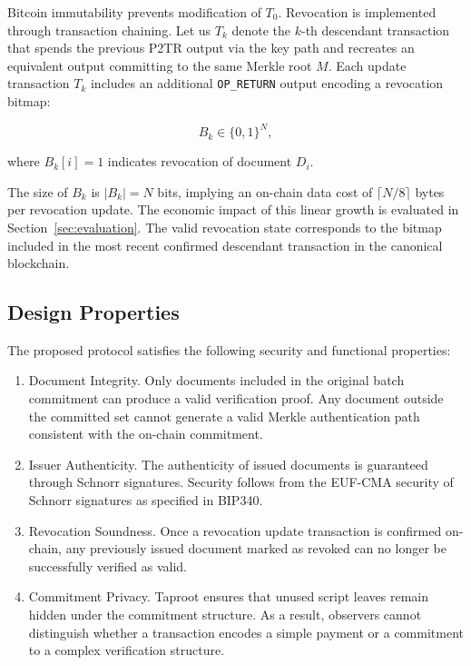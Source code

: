 \documentclass{IEEEoj}
\begin{document}
Bitcoin immutability prevents modification of $T_0$.  Revocation is implemented through transaction chaining. Let us $T_k$ denote the $k$-th descendant transaction that spends the previous P2TR output via the key path and recreates an equivalent output committing to the same Merkle root $M$. Each update transaction $T_k$ includes an additional \texttt{OP\_RETURN} output encoding a revocation bitmap:

\begin{equation}
B_k \in \{0,1\}^N,
\end{equation}

where $B_k[i]=1$ indicates revocation of document $D_i$.

The size of $B_k$ is $|B_k| = N$ bits, implying an on-chain data cost of $\lceil N/8 \rceil$ bytes per revocation update.  
The economic impact of this linear growth is evaluated in Section~\ref{sec:evaluation}.
The valid revocation state corresponds to the bitmap included in the most recent confirmed descendant transaction in the canonical blockchain.


\subsection{Design Properties}

The proposed protocol satisfies the following security and functional properties:

\begin{enumerate}
    \item Document Integrity.
    Only documents included in the original batch commitment can produce a valid verification proof. 
    Any document outside the committed set cannot generate a valid Merkle authentication path consistent with the on-chain commitment.

    \item Issuer Authenticity. 
    The authenticity of issued documents is guaranteed through Schnorr signatures. 
    Security follows from the EUF-CMA  security of Schnorr signatures as specified in BIP340.

    \item Revocation Soundness. 
    Once a revocation update transaction is confirmed on-chain, any previously issued document marked as revoked can no longer be successfully verified as valid.

    \item Commitment Privacy. 
    Taproot ensures that unused script leaves remain hidden under the commitment structure. 
    As a result, observers cannot distinguish whether a transaction encodes a simple payment or a commitment to a complex verification structure.
\end{enumerate}
\end{document}
